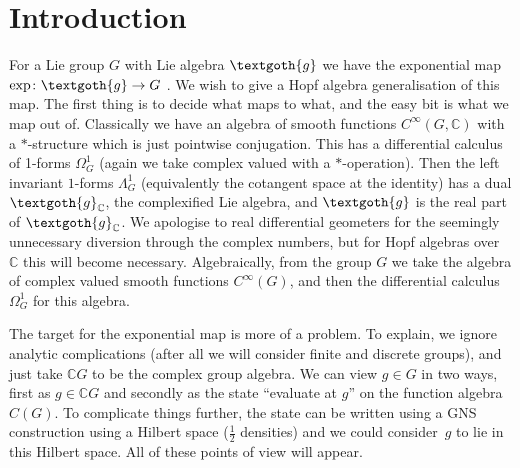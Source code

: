 \documentclass[pdftex]{sigma}
\numberwithin{equation}{section}
\newcommand{\C}{\mathbb{C}}
\newcommand{\<}{\langle}
\renewcommand{\>}{\rangle}
\begin{document}
\section{Introduction}
For a Lie group $ G $ with Lie algebra $ \textgoth{g} $ we have the exponential map $ \exp\colon \textgoth{g} \rightarrow G $ \cite{Hausner}. We wish to give a Hopf algebra generalisation of this map. The first thing is to decide what maps to what, and the easy bit is what we map out of. Classically we have an algebra of smooth functions $ C^{\infty } (G, \C) $ with a $ * $-structure which is just pointwise conjugation. This has a differential calculus of 1-forms $ \Omega_{G}^{1} $ (again we take complex valued with a $ * $-operation). Then the left invariant $ 1 $-forms $ \Lambda_{G}^{1} $ (equivalently the cotangent space at the identity) has a dual $ \textgoth{g} _{\C}$, the complexified Lie algebra, and $ \textgoth{g} $ is the real part of $ \textgoth{g} _{\C} $. We apologise to real differential geometers for the seemingly unnecessary diversion through the complex numbers, but for Hopf algebras over $ \C $ this will become necessary. Algebraically, from the group $ G $ we take the algebra of complex valued smooth functions $ C^{\infty}(G) $, and then the differential calculus $ \Omega_{G}^{1} $ for this algebra.

The target for the exponential map is more of a problem. To explain, we ignore analytic complications (after all we will consider finite and discrete groups), and just take $ \C G $ to be the complex group algebra. We can view $g\in G $ in two ways, first as $g\in \C G $ and secondly as the state ``evaluate at $ g $'' on the function algebra $ C (G )$. To complicate things further, the state can be written using a GNS construction using a Hilbert space ($\frac{1}{2}$ densities) and we could consider~$ g $ to lie in this Hilbert space. All of these points of view will appear.
\end{document}
